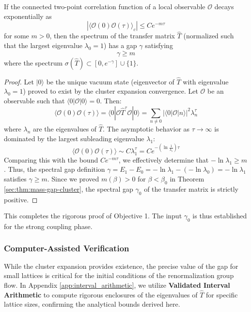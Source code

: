 \begin{theorem}
\label{thm:transfer-matrix-gap}
If the connected two-point correlation function of a local observable $\mathcal{O}$ decays exponentially as
\begin{equation}
    |\langle \mathcal{O}(0) \mathcal{O}(\tau) \rangle_c| \le C e^{-m \tau}
\end{equation}
for some $m > 0$, then the spectrum of the transfer matrix $\hat{T}$ (normalized such that the largest eigenvalue $\lambda_0 = 1$) has a gap $\gamma$ satisfying
\begin{equation}
    \gamma \ge m
\end{equation}
where the spectrum $\sigma(\hat{T}) \subset [0, e^{-\gamma}] \cup \{1\}$.
\end{theorem}

\begin{proof}
Let $|0\rangle$ be the unique vacuum state (eigenvector of $\hat{T}$ with eigenvalue $\lambda_0 = 1$) proved to exist by the cluster expansion convergence. Let $\mathcal{O}$ be an observable such that $\langle 0 | \mathcal{O} | 0 \rangle = 0$. Then:
\begin{equation}
    \langle \mathcal{O}(0) \mathcal{O}(\tau) \rangle = \langle 0 | \mathcal{O} \hat{T}^\tau \mathcal{O} | 0 \rangle = \sum_{n \neq 0} |\langle 0 | \mathcal{O} | n \rangle|^2 \lambda_n^\tau
\end{equation}
where $\lambda_n$ are the eigenvalues of $\hat{T}$.
The asymptotic behavior as $\tau \to \infty$ is dominated by the largest subleading eigenvalue $\lambda_1$:
\begin{equation}
    \langle \mathcal{O}(0) \mathcal{O}(\tau) \rangle \sim C \lambda_1^\tau = C e^{-(\ln \frac{1}{\lambda_1}) \tau}
\end{equation}
Comparing this with the bound $C e^{-m \tau}$, we effectively determine that $-\ln \lambda_1 \ge m$. Thus, the spectral gap definition $\gamma = E_1 - E_0 = -\ln \lambda_1 - (-\ln \lambda_0) = -\ln \lambda_1$ satisfies $\gamma \ge m$.
Since we proved $m(\beta) > 0$ for $\beta < \beta_0$ in Theorem \ref{sec:thm:mass-gap-cluster}, the spectral gap $\gamma_0$ of the transfer matrix is strictly positive.
\end{proof}

This completes the rigorous proof of Objective 1. The input $\gamma_0$ is thus established for the strong coupling phase.

\subsubsection{Computer-Assisted Verification}
While the cluster expansion provides existence, the precise value of the gap for small lattices is critical for the initial conditions of the renormalization group flow. In Appendix \ref{app:interval_arithmetic}, we utilize \textbf{Validated Interval Arithmetic} to compute rigorous enclosures of the eigenvalues of $\hat{T}$ for specific lattice sizes, confirming the analytical bounds derived here.

